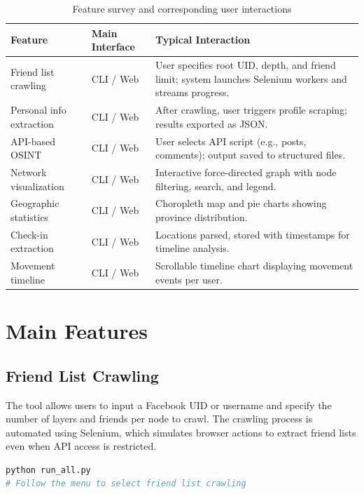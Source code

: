 \documentclass[13pt,a4paper]{report}
\begin{document}
\begin{table}[h!]
    \centering
    \caption{Feature survey and corresponding user interactions}
    \label{tab:feature-survey}
    \begin{tabular}{@{}llp{7.5cm}@{}}
        \toprule
        \textbf{Feature} & \textbf{Main Interface} & \textbf{Typical Interaction} \\ \midrule
        Friend list crawling & CLI / Web & User specifies root UID, depth, and friend limit; system launches Selenium workers and streams progress. \\
        Personal info extraction & CLI / Web & After crawling, user triggers profile scraping; results exported as JSON. \\
        API-based OSINT & CLI / Web & User selects API script (e.g., posts, comments); output saved to structured files. \\
        Network visualization & CLI / Web & Interactive force-directed graph with node filtering, search, and legend. \\
        Geographic statistics & CLI / Web & Choropleth map and pie charts showing province distribution. \\
        Check-in extraction & CLI / Web & Locations parsed, stored with timestamps for timeline analysis. \\
        Movement timeline & CLI / Web & Scrollable timeline chart displaying movement events per user. \\
        \bottomrule
    \end{tabular}
\end{table}

\chapter{Main Features}
\section{Friend List Crawling}
The tool allows users to input a Facebook UID or username and specify the number of layers and friends per node to crawl. The crawling process is automated using Selenium, which simulates browser actions to extract friend lists even when API access is restricted.

\begin{lstlisting}[language=Python, caption=Example: Initiating Friend List Crawling]
python run_all.py
# Follow the menu to select friend list crawling
\end{lstlisting}
\end{document}
